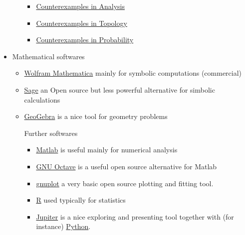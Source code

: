 \documentclass{article}
\begin{document}
\begin{itemize}
\begin{itemize}
\begin{itemize}
            \item \href{https://www.goodreads.com/en/book/show/818070.Counterexamples_in_Analysis}{Counterexamples in Analysis}
        
            \item \href{https://www.goodreads.com/book/show/116419.Counterexamples_in_Topology}{Counterexamples in Topology}
        
            \item \href{https://www.goodreads.com/book/show/2106285.Counterexamples_in_Probability}{Counterexamples in Probability}
    
    \end{itemize}
        
    \end{itemize}
    
    \item Mathematical softwares
    \begin{itemize}
        \item \href{https://www.wolfram.com/mathematica/}{Wolfram Mathematica} mainly for symbolic computations (commercial)
        
        \item \href{https://www.sagemath.org/}{Sage} an Open source but less powerful alternative for simbolic calculations
        
        \item \href{https://www.geogebra.org/}{GeoGebra} is a nice tool for geometry problems
        
        Further softwares
        \begin{itemize}
            \item \href{https://www.mathworks.com/products/matlab.html}{Matlab} is useful mainly for numerical analysis
        
            \item \href{https://www.gnu.org/software/octave/}{GNU Octave} is a useful open source alternative for Matlab
        
            \item \href{http://www.gnuplot.info/}{gnuplot} a very basic open source plotting and fitting tool.
        
            \item \href{https://www.r-project.org/}{R} used typically for statistics
        
            \item \href{https://jupyter.org/}{Jupiter} is a nice exploring and presenting tool together with (for instance) \href{https://www.python.org/}{Python}.
            

\end{itemize}
\end{itemize}
\end{itemize}
\end{document}

